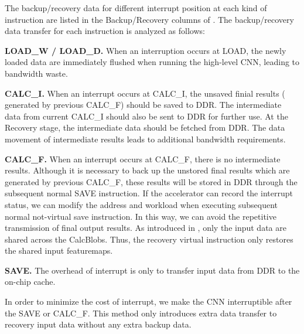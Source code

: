 The backup/recovery data for different interrupt position at each kind of instruction are listed in the Backup/Recovery columns of . The backup/recovery data transfer for each instruction is analyzed as follows:

\textbf{LOAD\_W / LOAD\_D. }
When an interruption occurs at LOAD, the newly loaded data are immediately flushed when running the high-level CNN, leading to bandwidth waste.

\textbf{CALC\_I.} 
When an interrupt occurs at CALC\_I, the unsaved finial results ( generated by previous CALC\_F) should be saved to DDR. The intermediate data from current CALC\_I should also be sent to DDR for further use. At the Recovery stage, the intermediate data should be fetched from DDR. The data movement of intermediate results leads to additional bandwidth requirements.


\textbf{CALC\_F.}
When an interrupt occurs at CALC\_F, there is no intermediate results. 
Although it is necessary to back up the unstored final results which are generated by previous CALC\_F, these results will be stored in DDR through the subsequent normal SAVE instruction.
If the accelerator can record the interrupt status, we can modify the address and workload when executing subsequent normal not-virtual save instruction.
In this way, we can avoid the repetitive transmission of final output results.
As introduced in , only the input data are shared across the CalcBlobs. Thus, the recovery virtual instruction only restores the shared input featuremaps.



\textbf{SAVE.}
The overhead of interrupt is only to transfer input data from DDR to the on-chip cache. 

In order to minimize the cost of interrupt, we make the CNN interruptible after the SAVE or CALC\_F. This method only introduces extra data transfer to recovery input data without any extra backup data.





